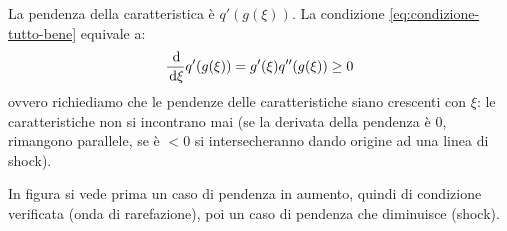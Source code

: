 \begin{nb}
    La pendenza della caratteristica è $\displaystyle q'(g(\xi)) .$ La condizione \eqref{eq:condizione-tutto-bene} equivale a:
    \begin{equation*}
        \frac{\de}{\dxi } q'(g(\xi)) =g'(\xi) q''(g(\xi)) \geq 0
    \end{equation*}
    ovvero richiediamo che le pendenze delle caratteristiche siano crescenti con $\xi $: le caratteristiche non si incontrano mai (se la derivata della pendenza è $0$, rimangono parallele, se è $< 0$ si intersecheranno dando origine ad una linea di shock).

    In figura si vede prima un caso di pendenza in aumento, quindi di condizione verificata (onda di rarefazione), poi un caso di pendenza che diminuisce (shock).

    \begin{figure}[H]
        \centering

        \begin{tikzpicture}[x=0.75pt,y=0.75pt,yscale=-1,xscale=1]


\end{tikzpicture}
\end{figure}
\end{nb}
